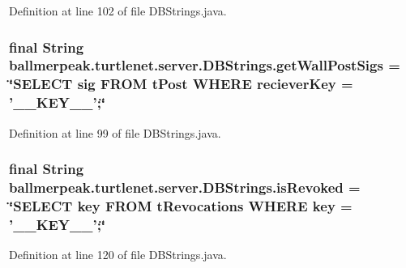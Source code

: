 Definition at line 102 of file D\-B\-Strings.\-java.

\hypertarget{classballmerpeak_1_1turtlenet_1_1server_1_1DBStrings_abc7b51ce40123124593dc92582e256b0}{
\subsubsection[{get\-Wall\-Post\-Sigs}]{\setlength{\rightskip}{0pt plus 5cm}final String ballmerpeak.\-turtlenet.\-server.\-D\-B\-Strings.\-get\-Wall\-Post\-Sigs = \char`\"{}S\-E\-L\-E\-C\-T sig F\-R\-O\-M t\-Post W\-H\-E\-R\-E reciever\-Key = '\-\_\-\-\_\-\-K\-E\-Y\-\_\-\-\_\-';\char`\"{}\hspace{0.3cm}{\ttfamily [static]}}}\label{classballmerpeak_1_1turtlenet_1_1server_1_1DBStrings_abc7b51ce40123124593dc92582e256b0}


Definition at line 99 of file D\-B\-Strings.\-java.

\hypertarget{classballmerpeak_1_1turtlenet_1_1server_1_1DBStrings_a18c48137c57f21cff5ba853fbf5f524f}{
\subsubsection[{is\-Revoked}]{\setlength{\rightskip}{0pt plus 5cm}final String ballmerpeak.\-turtlenet.\-server.\-D\-B\-Strings.\-is\-Revoked = \char`\"{}S\-E\-L\-E\-C\-T key F\-R\-O\-M t\-Revocations W\-H\-E\-R\-E key = '\-\_\-\-\_\-\-K\-E\-Y\-\_\-\-\_\-';\char`\"{}\hspace{0.3cm}{\ttfamily [static]}}}\label{classballmerpeak_1_1turtlenet_1_1server_1_1DBStrings_a18c48137c57f21cff5ba853fbf5f524f}


Definition at line 120 of file D\-B\-Strings.\-java.

